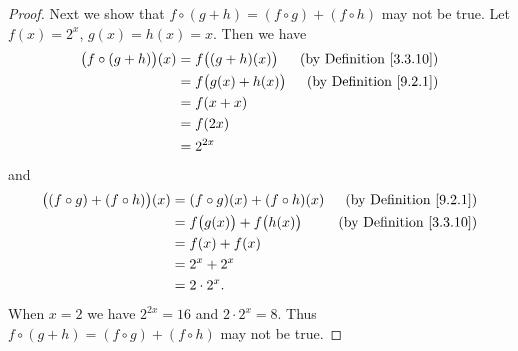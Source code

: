\begin{proof}
    Next we show that \(f \circ (g + h) = (f \circ g) + (f \circ h)\) may not be true.
    Let \(f(x) = 2^x\), \(g(x) = h(x) = x\).
    Then we have
    \begin{align*}
        \big(f \circ (g + h)\big)(x) & = f\big((g + h)(x)\big)  & \text{(by Definition \ref{3.3.10})} \\
                                     & = f\big(g(x) + h(x)\big) & \text{(by Definition \ref{9.2.1})}  \\
                                     & = f(x + x)                                                     \\
                                     & = f(2x)                                                        \\
                                     & = 2^{2x}
    \end{align*}
    and
    \begin{align*}
        \big((f \circ g) + (f \circ h)\big)(x) & = (f \circ g)(x) + (f \circ h)(x)   & \text{(by Definition \ref{9.2.1})}  \\
                                               & = f\big(g(x)\big) + f\big(h(x)\big) & \text{(by Definition \ref{3.3.10})} \\
                                               & = f(x) + f(x)                                                             \\
                                               & = 2^x + 2^x                                                               \\
                                               & = 2 \cdot 2^x.
    \end{align*}
    When \(x = 2\) we have \(2^{2x} = 16\) and \(2 \cdot 2^x = 8\).
    Thus \(f \circ (g + h) = (f \circ g) + (f \circ h)\) may not be true.


\end{proof}
